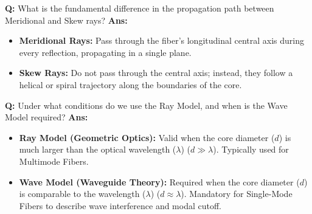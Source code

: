 \documentclass[10pt,a4paper,twocolumn]{article}
\begin{document}
\begin{tcolorbox}[
  colback=white,
  colframe=UnitColorOne,
  colbacktitle=gray!10!white,
  coltitle=black,
  fonttitle=\bfseries\sffamily\small,
  title={Unit I $\bullet$ Card 6: Meridional vs. Skew Rays},
  boxrule=1.2pt,
  arc=2mm,
  outer arc=2mm,
  boxsep=1.5mm,
  top=1mm,
  bottom=1mm,
  left=1.5mm,
  right=1.5mm,
  before skip=2.5mm,
  after skip=2.5mm
]
\textbf{Q:} What is the fundamental difference in the propagation path between Meridional and Skew rays?
\tcbline
\textbf{Ans:} \begin{itemize}
  \item   \textbf{Meridional Rays:} Pass through the fiber's longitudinal central axis during every reflection, propagating in a single plane.
  \item   \textbf{Skew Rays:} Do not pass through the central axis; instead, they follow a helical or spiral trajectory along the boundaries of the core.
\end{itemize}
\end{tcolorbox}


\begin{tcolorbox}[
  colback=white,
  colframe=UnitColorOne,
  colbacktitle=gray!10!white,
  coltitle=black,
  fonttitle=\bfseries\sffamily\small,
  title={Unit I $\bullet$ Card 7: Ray Model vs. Wave Model},
  boxrule=1.2pt,
  arc=2mm,
  outer arc=2mm,
  boxsep=1.5mm,
  top=1mm,
  bottom=1mm,
  left=1.5mm,
  right=1.5mm,
  before skip=2.5mm,
  after skip=2.5mm
]
\textbf{Q:} Under what conditions do we use the Ray Model, and when is the Wave Model required?
\tcbline
\textbf{Ans:} \begin{itemize}
  \item   \textbf{Ray Model (Geometric Optics):} Valid when the core diameter ($d$) is much larger than the optical wavelength ($\lambda$) ($d \gg \lambda$). Typically used for Multimode Fibers.
  \item   \textbf{Wave Model (Waveguide Theory):} Required when the core diameter ($d$) is comparable to the wavelength ($\lambda$) ($d \approx \lambda$). Mandatory for Single-Mode Fibers to describe wave interference and modal cutoff.
\end{itemize}
\end{tcolorbox}
\end{document}
